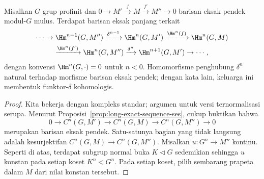 
\begin{theorem}\label{prop:profinite-cohomology-long}
	Misalkan $G$ grup profinit dan
	$0\to M'\xrightarrow{f}M\xrightarrow{f'}M''\to0$ barisan eksak pendek
	modul-$G$ mulus. Terdapat barisan eksak panjang terkait
	\begin{multline*}
		\cdots\to\Hm^{n-1}(G,M'')\xrightarrow{\delta^{n-1}}
		\Hm^n(G,M')\xrightarrow{\Hm^n(f)}\Hm^n(G,M)\\
		\xrightarrow{\Hm^n(f')}\Hm^n(G,M'')\xrightarrow{\delta^n}
		\Hm^{n+1}(G,M')\to\cdots,
	\end{multline*}
	dengan konvensi $\Hm^n(G,\cdot)=0$ untuk $n<0$. Homomorfisme penghubung
	$\delta^n$ natural terhadap morfisme barisan eksak pendek; dengan kata lain,
	keluarga ini membentuk funktor-$\delta$ kohomologis.
\end{theorem}
\begin{proof}
	Kita bekerja dengan kompleks standar; argumen untuk versi ternormalisasi
	serupa. Menurut Proposisi~\ref{prop:long-exact-sequence-ses}, cukup buktikan
	bahwa
	\[ 0\to C^n(G,M')\to C^n(G,M)\to C^n(G,M'')\to0 \]
	merupakan barisan eksak pendek. Satu-satunya bagian yang tidak langsung
	adalah kesurjektifan $C^n(G,M)\to C^n(G,M'')$. Misalkan
	$u:G^n\to M''$ kontinu. Seperti di atas, terdapat subgrup normal buka
	$K\lhd G$ sedemikian sehingga $u$ konstan pada setiap koset
	$K^n\lhd G^n$. Pada setiap koset, pilih sembarang prapeta dalam $M$ dari
	nilai konstan tersebut.
\end{proof}

